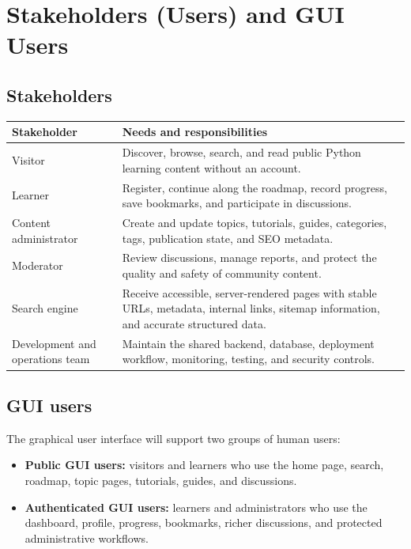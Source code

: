 \documentclass[11pt,a4paper]{article}
\begin{document}
\section{Stakeholders (Users) and GUI Users}

\subsection{Stakeholders}

\begin{tabularx}{\linewidth}{@{}p{.23\linewidth}X@{}}
\toprule
\textbf{Stakeholder} & \textbf{Needs and responsibilities}\\
\midrule
Visitor & Discover, browse, search, and read public Python learning content without
an account.\\
Learner & Register, continue along the roadmap, record progress, save bookmarks,
and participate in discussions.\\
Content administrator & Create and update topics, tutorials, guides, categories,
tags, publication state, and SEO metadata.\\
Moderator & Review discussions, manage reports, and protect the quality and safety
of community content.\\
Search engine & Receive accessible, server-rendered pages with stable URLs,
metadata, internal links, sitemap information, and accurate structured data.\\
Development and operations team & Maintain the shared backend, database, deployment
workflow, monitoring, testing, and security controls.\\
\bottomrule
\end{tabularx}

\subsection{GUI users}

The graphical user interface will support two groups of human users:

\begin{itemize}
  \item \textbf{Public GUI users:} visitors and learners who use the home page,
        search, roadmap, topic pages, tutorials, guides, and discussions.
  \item \textbf{Authenticated GUI users:} learners and administrators who use the
        dashboard, profile, progress, bookmarks, richer discussions, and protected
        administrative workflows.
\end{itemize}
\end{document}
